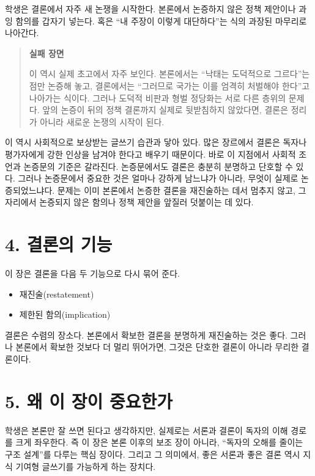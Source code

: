 학생은 결론에서 자주 새 논쟁을 시작한다. 본론에서 논증하지 않은 정책 제안이나 과잉 함의를 갑자기 넣는다. 혹은 ``내 주장이 이렇게 대단하다''는 식의 과장된 마무리로 나아간다.

\begin{quote}
\textbf{실패 장면}

이 역시 실제 초고에서 자주 보인다. 본론에서는 ``낙태는 도덕적으로 그르다''는 점만 논증해 놓고, 결론에서는 ``그러므로 국가는 이를 엄격히 처벌해야 한다''고 나아가는 식이다. 그러나 도덕적 비판과 형벌 정당화는 서로 다른 층위의 문제다. 앞의 논증이 뒤의 정책 결론까지 실제로 뒷받침하지 않았다면, 결론은 정리가 아니라 새로운 논쟁의 시작이 된다.
\end{quote}

이 역시 사회적으로 보상받는 글쓰기 습관과 닿아 있다. 많은 장르에서 결론은 독자나 평가자에게 강한 인상을 남겨야 한다고 배우기 때문이다. 바로 이 지점에서 사회적 조언과 논증문의 기준은 갈라진다. 논증문에서도 결론은 충분히 분명하고 단호할 수 있다. 그러나 논증문에서 중요한 것은 얼마나 강하게 남느냐가 아니라, 무엇이 실제로 논증되었느냐다. 문제는 이미 본론에서 논증한 결론을 재진술하는 데서 멈추지 않고, 그 자리에서 논증되지 않은 함의나 정책 제안을 앞질러 덧붙이는 데 있다.

\section{4. 결론의 기능}\label{4-uxacb0uxb860uxc758-uxae30uxb2a5}

이 장은 결론을 다음 두 기능으로 다시 묶어 준다.

\begin{itemize}
\tightlist
\item
  재진술(restatement)
\item
  제한된 함의(implication)
\end{itemize}

결론은 수렴의 장소다. 본론에서 확보한 결론을 분명하게 재진술하는 것은 좋다. 그러나 본론에서 확보한 것보다 더 멀리 뛰어가면, 그것은 단호한 결론이 아니라 무리한 결론이다.

\section{5. 왜 이 장이 중요한가}\label{5-uxc65c-uxc774-uxc7a5uxc774-uxc911uxc694uxd55cuxac00}

학생은 본론만 잘 쓰면 된다고 생각하지만, 실제로는 서론과 결론이 독자의 이해 경로를 크게 좌우한다. 즉 이 장은 본론 이후의 보조 장이 아니라, ``독자의 오해를 줄이는 구조 설계''를 다루는 핵심 장이다. 그리고 그 의미에서, 좋은 서론과 좋은 결론 역시 지식 기여형 글쓰기를 가능하게 하는 장치다.

